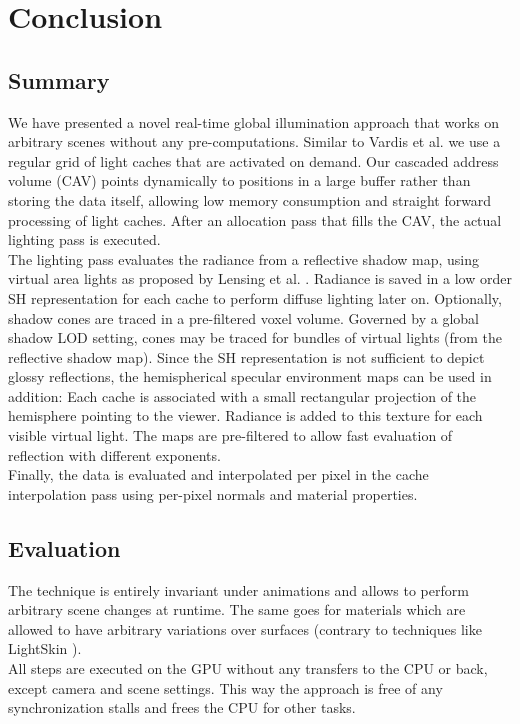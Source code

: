 \documentclass[thesis.tex]{subfiles}
\begin{document}
\chapter{Conclusion}\label{chap:concl}

\section{Summary}
We have presented a novel real-time global illumination approach that works on arbitrary scenes without any pre-computations.
Similar to Vardis et al. \cite{bib:radiancecachechromaticcompression} we use a regular grid of light caches that are activated on demand.
Our cascaded address volume (CAV) points dynamically to positions in a large buffer rather than storing the data itself, allowing low memory consumption and straight forward processing of light caches.
After an allocation pass that fills the CAV, the actual lighting pass is executed.
\\
The lighting pass evaluates the radiance from a reflective shadow map, using virtual area lights as proposed by Lensing et al. \cite{bib:LightskinPaper}.
Radiance is saved in a low order SH representation for each cache to perform diffuse lighting later on.
Optionally, shadow cones are traced in a pre-filtered voxel volume.
Governed by a global shadow LOD setting, cones may be traced for bundles of virtual lights (from the reflective shadow map).
Since the SH representation is not sufficient to depict glossy reflections, the hemispherical specular environment maps can be used in addition:
Each cache is associated with a small rectangular projection of the hemisphere pointing to the viewer.
Radiance is added to this texture for each visible virtual light.
The maps are pre-filtered to allow fast evaluation of reflection with different exponents.
\\
Finally, the data is evaluated and interpolated per pixel in the cache interpolation pass using per-pixel normals and material properties.


\section{Evaluation}

The technique is entirely invariant under animations and allows to perform arbitrary scene changes at runtime.
The same goes for materials which are allowed to have arbitrary variations over surfaces (contrary to techniques like LightSkin \cite{bib:LightskinPaper}).
\\
All steps are executed on the GPU without any transfers to the CPU or back, except camera and scene settings.
This way the approach is free of any synchronization stalls and frees the CPU for other tasks.
\end{document}

